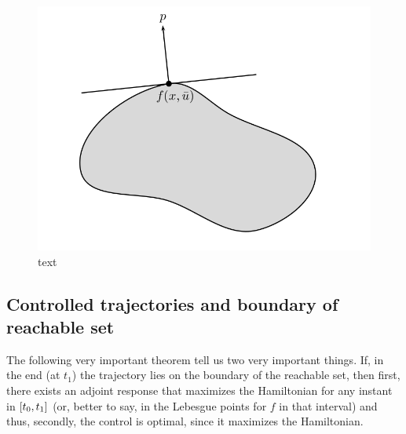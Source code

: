 \begin{figure}[h!]
	\includegraphics[width=\linewidth]{imgs/512-514.png}
	\caption{text}
	\label{fig-5.2}
\end{figure}

\subsection{Controlled trajectories and boundary of reachable set}
The following very important theorem tell us two very important things. If, in the end (at $t_1$) the trajectory lies on the boundary of the reachable set, then first, there exists an adjoint response that maximizes the Hamiltonian for any instant in $[t_0,t_1]$ (or, better to say, in the Lebesgue points for $f$ in that interval) and thus, secondly, the control is optimal, since it maximizes the Hamiltonian. \\


